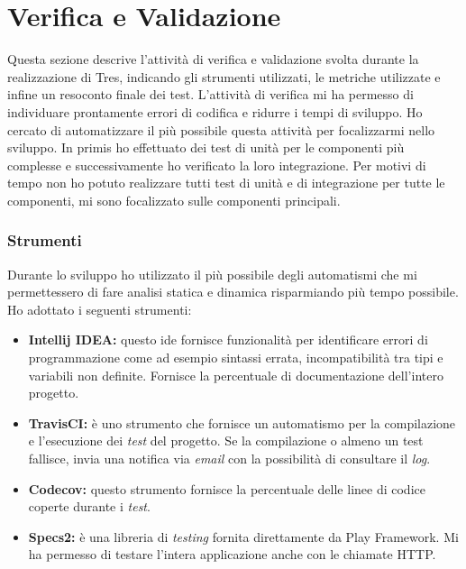 \section{Verifica e Validazione}
Questa sezione descrive l'attività di verifica e validazione svolta durante la realizzazione di Tres, indicando gli strumenti utilizzati, le metriche utilizzate e infine un resoconto finale dei test. L'attività di verifica mi ha permesso di individuare prontamente errori di codifica e ridurre i tempi di sviluppo. Ho cercato di automatizzare il più possibile questa attività per focalizzarmi nello sviluppo. In primis ho effettuato dei test di unità per le componenti più complesse e successivamente ho verificato la loro integrazione. Per motivi di tempo non ho potuto realizzare tutti test di unità e di integrazione per tutte le componenti, mi sono focalizzato sulle componenti principali. 
\subsubsection{Strumenti}
Durante lo sviluppo ho utilizzato il più possibile degli automatismi che mi permettessero di fare analisi statica e dinamica risparmiando più tempo possibile. Ho adottato i seguenti strumenti:
\begin{itemize}
\item \textbf{Intellij IDEA:} questo \gls{ide} fornisce funzionalità per identificare errori di programmazione come ad esempio sintassi errata, incompatibilità tra tipi e variabili non definite. Fornisce la percentuale di documentazione dell'intero progetto.
\item \textbf{TravisCI:} è uno strumento che fornisce un automatismo per la compilazione e l'esecuzione dei \emph{test} del progetto. Se la compilazione o almeno un test fallisce, invia una notifica via \emph{email} con la possibilità di consultare il \emph{log}.
\item \textbf{Codecov:} questo strumento fornisce la percentuale delle linee di codice coperte durante i \emph{test}.
\item \textbf{Specs2:} è una libreria di \emph{testing} fornita direttamente da Play Framework. Mi ha permesso di testare l'intera applicazione anche con le chiamate HTTP.
\end{itemize}
\newpage
